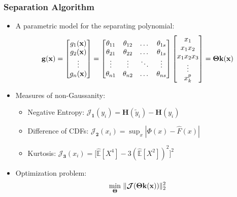 \documentclass[usenames,dvipsnames]{beamer}
\begin{document}
\begin{frame}
\frametitle{Separation Algorithm}
\begin{itemize}
\item A parametric model for the separating polynomial:
{\small\begin{equation*}
\label{E_Parametrizing}
{\bf g}({\bf x})=
\begin{bmatrix}
g_1({\bf x}) \\
g_2({\bf x}) \\
\vdots \\
g_n({\bf x})
\end{bmatrix}=
\begin{bmatrix}
\theta_{11} & \theta_{12} & \dots & \theta_{1s} \\
\theta_{21} & \theta_{22} & \dots & \theta_{1s} \\
\vdots&\vdots&\ddots&\vdots \\
\theta_{n1} & \theta_{n2} & \dots & \theta_{ns}
\end{bmatrix}
\begin{bmatrix}
x_1\\
x_1x_2\\
x_1x_2x_3\\
\vdots\\
x_k^p
\end{bmatrix}
=
\boldsymbol{\Theta}{\bf k}({\bf x})
\end{equation*}}
\vspace{-0.5cm}
\item Measures of non-Gaussanity:

\begin{itemize}
	\item Negative Entropy: 
	\hspace{0.35cm}	
	$
	\boldsymbol{\mathcal{J}_1}({ y_i})=\boldsymbol{H}({ \tilde{y}_i})-\boldsymbol{H}({ y_i})
	$
	\vspace{0.2cm}
	
	\item Difference of CDFs:\hspace{0.3cm}
	$
	\boldsymbol{\mathcal{J}_2}({ x_i})=\sup_x |\Phi(x) - \hat{F}(x)|
	$
	\item Kurtosis:\hspace{1.9cm}
	$
	\boldsymbol{\mathcal{J}_3}({ x_i})=\Big[\hat{\mathbb{E}}[X^4] - 3(\hat{\mathbb{E}}[X^2])^2 \Big]^2
	$
\end{itemize}



\item Optimization problem:
\begin{equation*}
\underset{\boldsymbol{\Theta}}{\min} \ \| \boldsymbol{\mathcal{J}}(\boldsymbol{\Theta}{\bf k}({\bf x})) \|_2^2
\end{equation*}

\end{itemize}
\end{frame}
\end{document}
